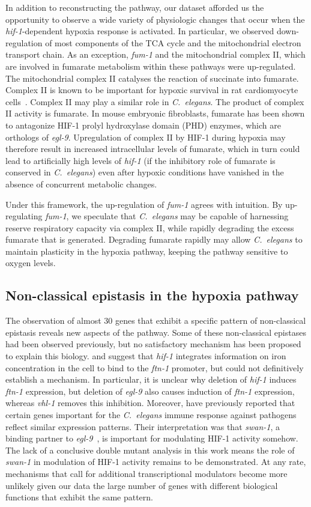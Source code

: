 \documentclass[9pt,twocolumn,twoside]{pnas-new}
\newcommand{\cel}{\emph{C.~elegans}}
\newcommand{\gene}[1]{\emph{#1}}
\newcommand{\ftna}{\emph{ftn-1}}
\newcommand{\egl}{\emph{egl-9}}
\newcommand{\vhl}{\emph{vhl-1}}
\newcommand{\hif}{\emph{hif-1}}
\newcommand{\hifp}{HIF-1}
\begin{document}
In addition to reconstructing the pathway, our dataset afforded us the opportunity
to observe a wide variety of physiologic changes that occur when the \hif{}-dependent
hypoxia response is activated. In particular, we observed down-regulation of most
components of the TCA cycle and the mitochondrial electron transport chain.
As an exception, \gene{fum-1} and the mitochondrial complex II, which are involved
in fumarate metabolism within these pathways were up-regulated. The mitochondrial
complex II catalyses the reaction of succinate into fumarate. Complex II is known
to be important for hypoxic survival in rat cardiomyocyte cells~\cite{Pfleger2015}.
Complex II may play a similar role in \cel{}. The product of complex II
activity is fumarate. In mouse embryonic fibroblasts, fumarate has been
shown to antagonize \hifp{} prolyl hydroxylase domain (PHD) enzymes, which are
orthologs of \egl{}. Upregulation of complex II by \hifp{} during hypoxia may
therefore result in increased intracellular levels of fumarate, which in turn could
lead to artificially high levels of \hif{} (if the inhibitory role of fumarate is
conserved in \cel{}) even after hypoxic conditions have vanished in the absence
of concurrent metabolic changes.

Under this framework, the up-regulation of \gene{fum-1} agrees with intuition. By
up-regulating \gene{fum-1}, we speculate that \cel{} may be capable of harnessing
reserve respiratory capacity via complex II, while rapidly degrading the excess
fumarate that is generated. Degrading fumarate rapidly may allow \cel{} to
maintain plasticity in the hypoxia pathway, keeping the pathway sensitive to
oxygen levels.

\subsection*{Non-classical epistasis in the hypoxia pathway}
The observation of almost 30 genes that exhibit a specific pattern of non-classical
epistasis reveals new aspects of the pathway. Some of these non-classical
epistases had been observed previously, but no satisfactory mechanism has been
proposed to explain this biology. \citep{Romney2011} and \citep{Ackerman2012}
suggest that \hif{} integrates information on iron concentration in the
cell to bind to the \ftna{} promoter, but could not definitively establish
a mechanism.
In particular, it is unclear why deletion of \hif{} induces \ftna{}
expression, but deletion of \egl{} also causes induction of \ftna{} expression,
whereas \vhl{} removes this inhibition. Moreover, \citep{Luhachack2012} have
previously reported that certain genes important for the \cel{} immune response
against pathogens reflect similar expression patterns. Their interpretation
was that \gene{swan-1}, a binding partner to \egl{}~\cite{Shao2010}, is important
for modulating \hifp{} activity somehow. The lack of a conclusive double
mutant analysis in this work means the role of \gene{swan-1} in modulation of
\hifp{} activity remains to be demonstrated.
At any rate, mechanisms that call for additional
transcriptional modulators become more unlikely given our data the large number of
genes with different biological functions that exhibit the same pattern.
\end{document}

